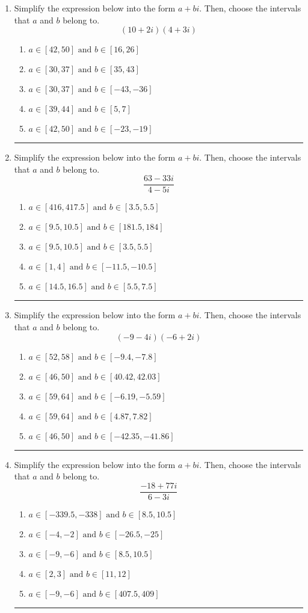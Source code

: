 \documentclass[14pt]{extbook}
\newcommand{\litem}[1]{\item#1\hspace*{-1cm}\rule{\textwidth}{0.4pt}}
\begin{document}
\begin{enumerate}
{\begin{enumerate}[label=\Alph*.]
\end{enumerate} }
\litem{
Simplify the expression below into the form $a+bi$. Then, choose the intervals that $a$ and $b$ belong to.\[ (10 + 2 i)(4 + 3 i) \]\begin{enumerate}[label=\Alph*.]
\item \( a \in [42, 50] \text{ and } b \in [16, 26] \)
\item \( a \in [30, 37] \text{ and } b \in [35, 43] \)
\item \( a \in [30, 37] \text{ and } b \in [-43, -36] \)
\item \( a \in [39, 44] \text{ and } b \in [5, 7] \)
\item \( a \in [42, 50] \text{ and } b \in [-23, -19] \)

\end{enumerate} }
\litem{
Simplify the expression below into the form $a+bi$. Then, choose the intervals that $a$ and $b$ belong to.\[ \frac{63 - 33 i}{4 - 5 i} \]\begin{enumerate}[label=\Alph*.]
\item \( a \in [416, 417.5] \text{ and } b \in [3.5, 5.5] \)
\item \( a \in [9.5, 10.5] \text{ and } b \in [181.5, 184] \)
\item \( a \in [9.5, 10.5] \text{ and } b \in [3.5, 5.5] \)
\item \( a \in [1, 4] \text{ and } b \in [-11.5, -10.5] \)
\item \( a \in [14.5, 16.5] \text{ and } b \in [5.5, 7.5] \)

\end{enumerate} }
\litem{
Simplify the expression below into the form $a+bi$. Then, choose the intervals that $a$ and $b$ belong to.\[ (-9 - 4 i)(-6 + 2 i) \]\begin{enumerate}[label=\Alph*.]
\item \( a \in [52, 58] \text{ and } b \in [-9.4, -7.8] \)
\item \( a \in [46, 50] \text{ and } b \in [40.42, 42.03] \)
\item \( a \in [59, 64] \text{ and } b \in [-6.19, -5.59] \)
\item \( a \in [59, 64] \text{ and } b \in [4.87, 7.82] \)
\item \( a \in [46, 50] \text{ and } b \in [-42.35, -41.86] \)

\end{enumerate} }
\litem{
Simplify the expression below into the form $a+bi$. Then, choose the intervals that $a$ and $b$ belong to.\[ \frac{-18 + 77 i}{6 - 3 i} \]\begin{enumerate}[label=\Alph*.]
\item \( a \in [-339.5, -338] \text{ and } b \in [8.5, 10.5] \)
\item \( a \in [-4, -2] \text{ and } b \in [-26.5, -25] \)
\item \( a \in [-9, -6] \text{ and } b \in [8.5, 10.5] \)
\item \( a \in [2, 3] \text{ and } b \in [11, 12] \)
\item \( a \in [-9, -6] \text{ and } b \in [407.5, 409] \)


\end{enumerate}}
\end{enumerate}
\end{document}

